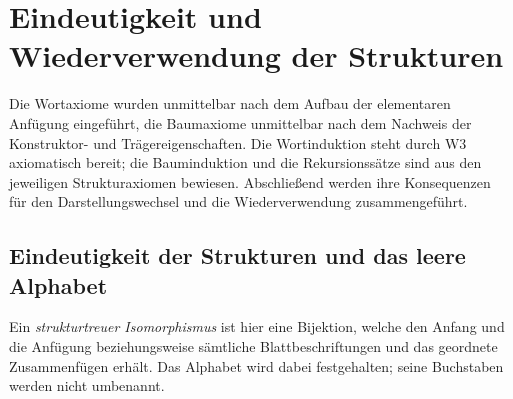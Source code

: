 \chapter{Eindeutigkeit und Wiederverwendung der Strukturen}

Die Wortaxiome wurden unmittelbar nach dem Aufbau der elementaren
Anfügung eingeführt, die Baumaxiome unmittelbar nach dem Nachweis der
Konstruktor- und Trägereigenschaften. Die Wortinduktion steht durch W3
axiomatisch bereit; die Bauminduktion und die Rekursionssätze sind aus
den jeweiligen Strukturaxiomen bewiesen. Abschließend
werden ihre Konsequenzen für den Darstellungswechsel und die
Wiederverwendung zusammengeführt.

\section{Eindeutigkeit der Strukturen und das leere Alphabet}

Ein \emph{strukturtreuer Isomorphismus} ist hier eine Bijektion, welche
den Anfang und die Anfügung beziehungsweise sämtliche Blattbeschriftungen
und das geordnete Zusammenfügen erhält. Das Alphabet wird dabei
festgehalten; seine Buchstaben werden nicht umbenannt.

